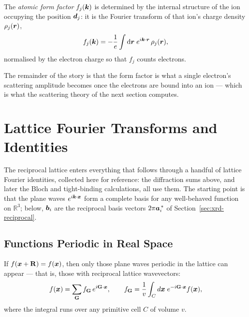 \begin{definition}
The \emph{atomic form factor} $f_j(\bm{k})$ is determined by the internal structure of the ion occupying the position $\bm{d}_j$: it is the Fourier transform of that ion's charge density $\rho_j(\bm{r})$,
\begin{equation}
    f_j(\bm{k}) = -\frac{1}{e}\int \dd\bm{r}\; e^{i\bm{k}\cdot\bm{r}}\,\rho_j(\bm{r}),
\end{equation}
normalised by the electron charge so that $f_j$ counts electrons.
\end{definition}

The remainder of the story is that the form factor is what a single electron's scattering amplitude becomes once the electrons are bound into an ion --- which is what the scattering theory of the next section computes.


\section{Lattice Fourier Transforms and Identities}

The reciprocal lattice enters everything that follows through a handful of lattice Fourier identities, collected here for reference: the diffraction sums above, and later the Bloch and tight-binding calculations, all use them. The starting point is that the plane waves $e^{i\bm{k}\cdot\bm{x}}$ form a complete basis for any well-behaved function on $\mathbb{R}^3$; below, $\bm{b}_i$ are the reciprocal basis vectors $2\pi\bm{a}^{\,*}_i$ of Section~\ref{sec:xrd-reciprocal}.

\subsection{Functions Periodic in Real Space}

If $f(\lvect{x}+\cvect{R}) = f(\lvect{x})$, then only those plane waves periodic in the lattice can appear --- that is, those with reciprocal lattice wavevectors:
\begin{equation}
    f(\lvect{x}) = \sum_{\cvect{G}} f_{\cvect{G}}\, e^{i\cvect{G}\cdot\lvect{x}},
    \qquad
    f_{\cvect{G}} = \frac{1}{v}\int_C d\lvect{x}\; e^{-i\cvect{G}\cdot\lvect{x}} f(\lvect{x}),
\end{equation}
where the integral runs over any primitive cell $C$ of volume $v$.

